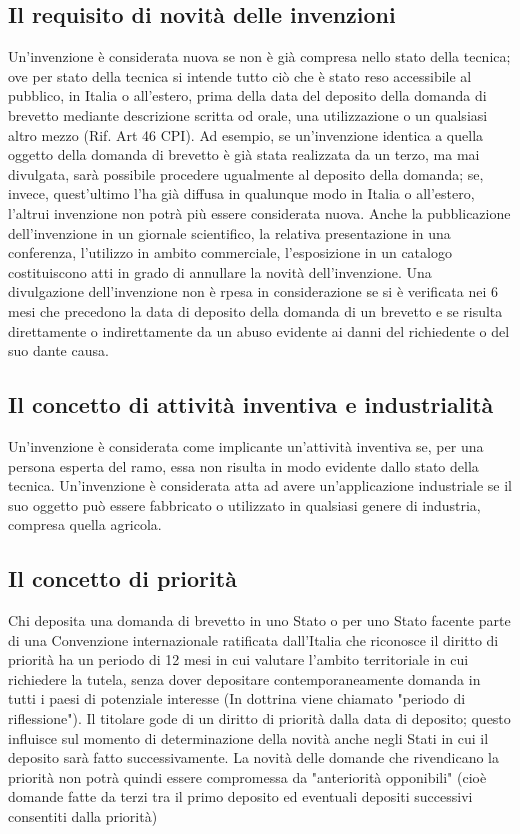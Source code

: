 \subsection{Il requisito di novità delle invenzioni}
Un’invenzione è considerata nuova se non è già compresa nello stato della tecnica; ove per stato della tecnica si intende tutto ciò che è stato reso accessibile al pubblico, in Italia o all’estero, prima della data del deposito della domanda di brevetto mediante descrizione scritta od orale, una utilizzazione o un qualsiasi altro mezzo (Rif. Art 46 CPI). Ad esempio, se un’invenzione identica a quella oggetto della domanda di brevetto è già stata realizzata da un terzo, ma mai divulgata, sarà possibile procedere ugualmente al deposito della domanda; se, invece, quest’ultimo l’ha già diffusa in qualunque modo in Italia o all’estero, l’altrui invenzione non potrà più essere considerata nuova. Anche la pubblicazione dell’invenzione in un giornale scientifico, la relativa presentazione in una conferenza, l’utilizzo in ambito commerciale, l’esposizione in un catalogo costituiscono atti in grado di annullare la novità dell’invenzione.
\newline Una divulgazione dell'invenzione non è rpesa in considerazione se si è verificata nei 6 mesi che precedono
la data di deposito della domanda di un brevetto e se risulta direttamente o indirettamente da un abuso evidente ai danni del richiedente
o del suo dante causa.

\subsection{Il concetto di attività inventiva e industrialità}
Un'invenzione è considerata come implicante un'attività inventiva se, per una persona esperta del ramo, essa non risulta in modo evidente
dallo stato della tecnica.\newline
Un'invenzione è considerata atta ad avere un'applicazione industriale se il suo oggetto può essere fabbricato o utilizzato in qualsiasi genere di
industria, compresa quella agricola.

\subsection{Il concetto di priorità}
Chi deposita una domanda di brevetto in uno Stato o per uno Stato facente parte di una Convenzione internazionale ratificata dall'Italia che riconosce
il diritto di priorità ha un periodo di 12 mesi in cui valutare l'ambito territoriale in cui richiedere la tutela, senza dover depositare contemporaneamente
domanda in tutti i paesi di potenziale interesse (In dottrina viene chiamato "periodo di riflessione").\newline
Il titolare gode di un diritto di priorità dalla data di deposito; questo influisce sul momento di determinazione della novità anche negli Stati in cui il deposito
sarà fatto successivamente.\newline
La novità delle domande che rivendicano la priorità non potrà quindi essere compromessa da "anteriorità opponibili" (cioè domande fatte da terzi tra il primo
deposito ed eventuali depositi successivi consentiti dalla priorità)

